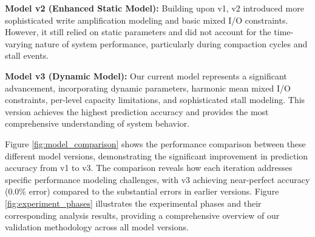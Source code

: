 \documentclass[11pt]{article}
\begin{document}
\textbf{Model v2 (Enhanced Static Model):} Building upon v1, v2 introduced more sophisticated write amplification modeling and basic mixed I/O constraints. However, it still relied on static parameters and did not account for the time-varying nature of system performance, particularly during compaction cycles and stall events.

\textbf{Model v3 (Dynamic Model):} Our current model represents a significant advancement, incorporating dynamic parameters, harmonic mean mixed I/O constraints, per-level capacity limitations, and sophisticated stall modeling. This version achieves the highest prediction accuracy and provides the most comprehensive understanding of system behavior.

Figure \ref{fig:model_comparison} shows the performance comparison between these different model versions, demonstrating the significant improvement in prediction accuracy from v1 to v3. The comparison reveals how each iteration addresses specific performance modeling challenges, with v3 achieving near-perfect accuracy (0.0\% error) compared to the substantial errors in earlier versions. Figure \ref{fig:experiment_phases} illustrates the experimental phases and their corresponding analysis results, providing a comprehensive overview of our validation methodology across all model versions.
\end{document}
